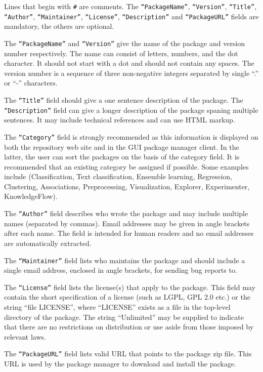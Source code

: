 Lines that begin with \verb=#= are comments. The
\texttt{``PackageName''}, \texttt{``Version''}, \texttt{``Title''},
\texttt{``Author''}, \texttt{``Maintainer''}, \texttt{``License''},
\texttt{``Description''} and \texttt{``PackageURL''} fields are
mandatory, the others are optional.

The \texttt{``PackageName''} and \texttt{``Version''} give the name
of the package and version number respectively. The name can consist of
letters, numbers, and the dot character. It should not start with a dot
and should not contain any spaces. The version number is a sequence of
three non-negative integers separated by single ``.'' or ``-'' characters.

The \texttt{``Title''} field should give a one sentence description of
the package. The \texttt{``Description''} field can give a longer
description of the package spaning multiple sentences. It may include
technical references and can use HTML markup.

The \texttt{``Category''} field is strongly recommended as this
information is displayed on both the repository web site and in the
GUI package manager client. In the latter, the user can sort the
packages on the basis of the category field. It is recommended that an
existing category be assigned if possible. Some examples include
(Classification, Text classification, Ensemble learning, Regression,
Clustering, Associations, Preprocessing, Visualization, Explorer,
Experimenter, KnowledgeFlow).

The \texttt{``Author''} field describes who wrote the package and may
include multiple names (separated by commas). Email addresses may be
given in angle brackets after each name. The field is intended for
human readers and no email addresses are automatically extracted.

The \texttt{``Maintainer''} field lists who maintains the package and
should include a single email address, enclosed in angle brackets, for
sending bug reports to.

The \texttt{``License''} field lists the license(s) that apply to the
package. This field may contain the short specification of a license
(such as LGPL, GPL 2.0 etc.) or the string ``file LICENSE'', where
``LICENSE'' exists as a file in the top-level directory of the
package. The string ``Unlimited'' may be supplied to indicate that
there are no restrictions on distribution or use aside from those
imposed by relevant laws.

The \texttt{``PackageURL''} field lists valid URL that points to the
package zip file. This URL is used by the package manager to download
and install the package.

